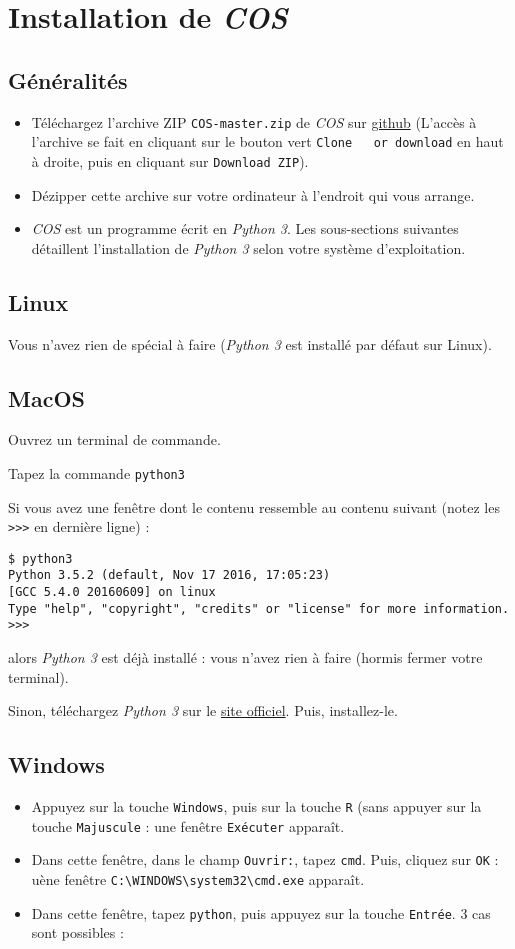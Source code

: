 \documentclass[11pt]{article}
\begin{document}
\section{Installation de \emph{COS}}
\label{sec-2}
\subsection{Généralités}
\label{sec-2-1}
\begin{itemize}
\item Téléchargez l'archive ZIP \verb~COS-master.zip~ de \emph{COS} sur \href{https://github.com/simatic/COS}{github}
  (L'accès à l'archive se fait en cliquant sur le bouton vert \verb~Clone   or download~ en haut à droite, puis en cliquant sur \verb~Download ZIP~).
\item Dézipper cette archive sur votre ordinateur à l'endroit qui vous
arrange.
\item \emph{COS} est un programme écrit en \emph{Python 3}. Les sous-sections
suivantes détaillent l'installation de \emph{Python 3} selon votre
système d'exploitation.
\end{itemize}
\subsection{Linux}
\label{sec-2-2}
Vous n'avez rien de spécial à faire (\emph{Python 3} est installé par
défaut sur Linux).
\subsection{MacOS}
\label{sec-2-3}
Ouvrez un terminal de commande.

Tapez la commande \verb~python3~

Si vous avez une fenêtre dont le contenu ressemble au contenu suivant
(notez les \verb~>>>~ en dernière ligne) :
\begin{verbatim}
$ python3
Python 3.5.2 (default, Nov 17 2016, 17:05:23) 
[GCC 5.4.0 20160609] on linux
Type "help", "copyright", "credits" or "license" for more information.
>>>
\end{verbatim}
alors \emph{Python 3} est déjà installé : vous n'avez rien à faire (hormis
fermer votre terminal).

Sinon, téléchargez \emph{Python 3} sur le \href{https://www.python.org/downloads/mac-osx/}{site officiel}. Puis, installez-le.
\subsection{Windows}
\label{sec-2-4}
\begin{itemize}
\item Appuyez sur la touche \verb~Windows~, puis sur la touche \verb~R~ (sans
appuyer sur la touche \verb~Majuscule~ : une fenêtre \verb~Exécuter~ apparaît.
\item Dans cette fenêtre, dans le champ \verb~Ouvrir:~, tapez \verb~cmd~. Puis,
cliquez sur \verb~OK~ : uène fenêtre \verb~C:\WINDOWS\system32\cmd.exe~
apparaît.
\item Dans cette fenêtre, tapez \verb~python~, puis appuyez sur la touche
\verb~Entrée~. 3 cas sont possibles :
\end{itemize}
\end{document}
